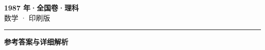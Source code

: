 \documentclass[zihao=5, a4paper]{ctexart}
\begin{document}
\begin{center}
  {\Large\bfseries 1987 年·全国卷·理科}\\[4pt]
  {\large 数学 · 印刷版}
\end{center}
\medskip
{}

\par\bigskip\hrule\bigskip
{}
\begin{center}{\large\bfseries 参考答案与详细解析}\end{center}
\smallskip

\end{document}
